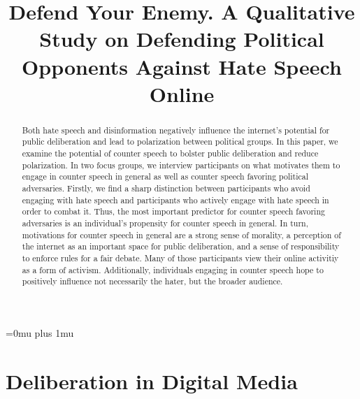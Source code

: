 \documentclass[runningheads]{llncs}
\begin{document}
%
\title{Defend Your Enemy. A Qualitative Study on Defending Political Opponents Against Hate Speech Online}
%


%


%
\maketitle              %
%
\begin{abstract}
Both hate speech and disinformation negatively influence the internet's potential for public deliberation and lead to polarization between political groups. In this paper, we examine the potential of counter speech to bolster public deliberation and reduce polarization. In two focus groups, we interview participants on what motivates them to engage in counter speech in general as well as counter speech favoring political adversaries. Firstly, we find a sharp distinction between participants who avoid engaging with hate speech and participants who actively engage with hate speech in order to combat it. Thus, the most important predictor for counter speech favoring adversaries is an individual's propensity for counter speech in general. In turn, motivations for counter speech in general are a strong sense of morality, a perception of the internet as an important space for public deliberation, and a sense of responsibility to enforce rules for a fair debate. Many of those participants view their online activitiy as a form of activism. Additionally, individuals engaging in counter speech hope to positively influence not necessarily the hater, but the broader audience.

\end{abstract}
%
%
%
\Urlmuskip=0mu plus 1mu
\setcounter{footnote}{0}

\hypertarget{deliberation-in-digital-media}{%
\section{Deliberation in Digital Media}\label{deliberation-in-digital-media}}
\end{document}
